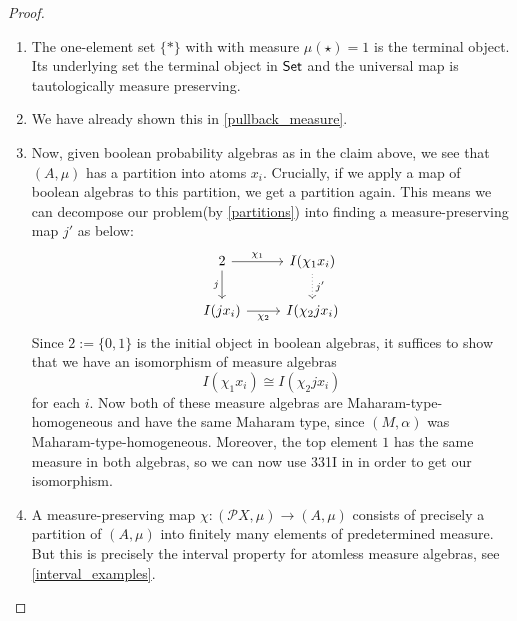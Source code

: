 \documentclass[a4paper]{amsproc}
\theoremstyle{plain}
\theoremstyle{definition}
\theoremstyle{remark}
\numberwithin{equation}{section}
\newcommand{\Set}{\textup{\textsf{Set}}}
\newcommand{\la}{\langle\,}
\newcommand{\ra}{\,\rangle}
\begin{document}
\begin{proof}
\begin{enumerate}
\item The one-element set $\{*\}$ with with measure $\mu(\star)=1$ is the terminal object. Its underlying set the terminal object in $\Set$ and the universal map is tautologically measure preserving.
\item We have already shown this in \ref{pullback_measure}.
\item
Now, given boolean probability algebras as in the claim above, we see that $(A, \mu)$ has a partition into atoms $x_i$. Crucially, if we apply a map of boolean algebras to this partition, we get a partition again. This means we can decompose our problem(by \ref{partitions}) into finding a measure-preserving map $j'$ as below:
\[
\begin{tikzcd}
2 \arrow[d, "j"'] \arrow[r, "\chi_1"]  & I(\chi_1 x_i) \arrow[d, "j'", dotted] \\
I(j x_i) \arrow[r, "\chi_2"'] & I(\chi_2 j x_i)
\end{tikzcd}
\]
Since $2 := \{0, 1\}$ is the initial object in boolean algebras, it suffices to show that we have an isomorphism of measure algebras
\[
I(\chi_1 x_i) \cong I(\chi_2 j x_i)
\]
for each $i$. Now both of these measure algebras are Maharam-type-homogeneous and have the same Maharam type, since $(M, \alpha)$ was Maharam-type-homogeneous. Moreover, the top element $1$ has the same measure in both algebras, so we can now use 331I in \cite{fremlin} in order to get our isomorphism.

\item A measure-preserving map $\chi:(\mathcal{P} X,\mu)\rightarrow (A,\mu)$ consists of precisely a partition of $(A,\mu)$ into finitely many elements of predetermined measure. But this is precisely the interval property for atomless measure algebras, see \ref{interval_examples}.

\end{enumerate}
\end{proof}
\end{document}
